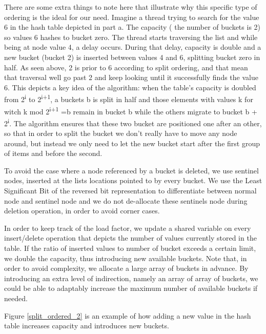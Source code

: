 There are some extra things to note here that illustrate why this specific type of ordering is the ideal for our need. Imagine a thread trying to search for the value 6 in the hash table depicted in part a. The capacity ( the number of buckets is 2) so values 6 hashes to bucket zero. The thread starts traversing the list and while being at node value 4, a delay occurs. During that delay, capacity is double and a new bucket (bucket 2) is inserted between values 4 and 6, splitting bucket zero in half. As seen above, 2 is prior to 6 according to split ordering, and that mean that traversal well go past 2 and keep looking until it successfully finds the value 6. This depicts a key idea of the algorithm: when the table's capacity is doubled from 2\textsuperscript{i} to 2\textsuperscript{i+1}, a buckets b is split in half and those elements with values k for witch k mod 2\textsuperscript{i+1} =b  remain in bucket b while the others migrate to bucket b + 2\textsuperscript{i}. The algorithm ensures that these two bucket are positioned one after an other, so that in order to split the bucket we don’t really have to move any node around, but instead we only need to let the new bucket start after the first group of items and before the second.

To avoid the case where a node referenced by a bucket is deleted, we use sentinel nodes, inserted at the lists locations pointed to by every bucket. We use the Least Significant Bit of the reversed bit representation to differentiate between normal node and sentinel node and we do not de-allocate these sentinels node during deletion operation, in order to avoid corner cases.

In order to keep track of the load factor, we update a shared variable on every insert/delete operation that depicts the number of values currently stored in the table. If the ratio of inserted values to number of bucket exceeds a certain limit, we double the capacity, thus introducing new available buckets. Note that, in order to avoid complexity, we allocate a large array of buckets in advance. By introducing an extra level of indirection, namely an array of array of buckets, we could be able to adaptably increase the maximum number of available buckets if needed.

Figure \ref{split_ordered_2} is an example of how adding a new value in the hash table increases capacity and introduces new buckets.

